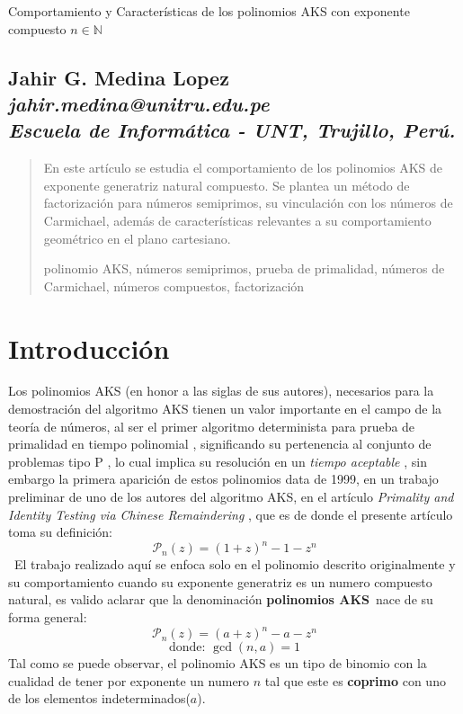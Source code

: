 \documentclass[a4paper, 12pt]{article}
\begin{document}
\begin{center}
\Large {Comportamiento y Características de los polinomios AKS con exponente compuesto \(n\in \mathbb{N}\)} \\
\vskip 0.2cm
 \end{center}
\vskip 1cm
\begin{center}
\section*{{\large{Jahir G. Medina Lopez}}\\ {\it \small{jahir.medina@unitru.edu.pe}\\ \small{ Escuela de Informática - UNT, Trujillo, Perú.}} }
\end{center}

\begin{abstract}
En este artículo se estudia el comportamiento de los polinomios AKS de exponente generatriz natural compuesto.
Se plantea un método de factorización para números semiprimos, su vinculación con los números de Carmichael, además de características relevantes a su comportamiento geométrico en el plano cartesiano.


\vskip 0.3cm
\hspace*{-0.6cm}{\bf Palabras claves:} polinomio AKS, números semiprimos, prueba de primalidad, números de Carmichael, números compuestos, factorización
\end{abstract}

\section{Introducción}
Los polinomios AKS (en honor a las siglas de sus autores), necesarios para la demostración del algoritmo AKS \citep{AKS} tienen un valor importante en el campo de la teoría de números, al ser el primer algoritmo determinista para prueba de primalidad en tiempo polinomial , significando su pertenencia al conjunto de problemas tipo P , lo cual implica su resolución en un \textit{tiempo aceptable} \citep[Lectura 1]{pteory} , sin embargo la primera aparición de estos polinomios data de 1999, en un trabajo preliminar de uno de los autores del algoritmo AKS, en el artículo \textit{Primality and Identity Testing via Chinese Remaindering} \citep{preAKS}, que es de donde el presente artículo toma su definición:
\[ \mathcal{P}_{n}(z) = (1 + z)^{n} - 1 - z^{n}  \]
\
El trabajo realizado aquí se enfoca solo en el polinomio descrito originalmente y su comportamiento cuando su exponente generatriz es un numero compuesto natural, es valido aclarar que la denominación \textbf{polinomios AKS}\ nace de su forma general:
\[ \mathcal{P}_{n}(z) = (a + z)^{n} - a - z^{n} \]
\[\text{donde: } \gcd(n,a) = 1\]
Tal como se puede observar, el polinomio AKS es un tipo de binomio con la cualidad de tener por exponente un numero $n$ tal que este es \textbf{coprimo} con uno de los elementos indeterminados($a$).
\end{document}
